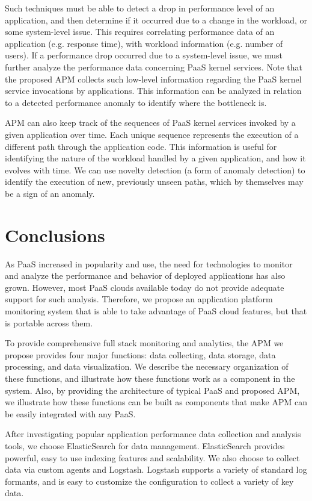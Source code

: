 \documentclass[11pt]{article}
\begin{document}
Such techniques must be able to detect a drop in performance level of an application, and then
determine if it occurred due to a change in the workload, or some system-level issue. This requires
correlating performance data of an application (e.g. response time), with workload information (e.g. number
of users). If a performance drop
occurred due to a system-level issue, we must further analyze the performance data concerning
PaaS kernel services. Note that the proposed APM collects such low-level information regarding
the PaaS kernel service invocations by applications. This information can be analyzed in relation 
to a detected performance anomaly to identify where the bottleneck is.

APM can also keep track of the sequences of PaaS kernel services invoked by a given application over time.
Each unique sequence represents the execution of a different path through the application code. 
This information is useful for
identifying the nature of the workload handled by a given application, and how it evolves with time. 
We can use novelty detection (a form of anomaly detection) to identify the execution of new, previously
unseen paths, which by themselves may be a sign of an anomaly.

\section{Conclusions}
As PaaS increased in popularity and use, the need 
for technologies to monitor and analyze the performance and behavior of
deployed applications has also grown. 
However, most PaaS clouds available today do not provide adequate support
for such analysis.
Therefore, we propose an application platform monitoring system that 
is able to take advantage of PaaS cloud features, but that is portable
across them.

To provide comprehensive full stack monitoring and analytics, 
the APM we propose provides four major functions:
data collecting, data storage, data processing, and data visualization. 
We describe the necessary organization of
these functions, and illustrate how these functions work as 
a component in the system. Also, by providing the
architecture of typical PaaS and proposed APM, we illustrate how these functions can be built as components that
make APM can be easily integrated with any PaaS.

After investigating popular application performance data collection and analysis tools, we choose ElasticSearch for data management.
ElasticSearch provides powerful, easy to use indexing features and scalability. We also choose to collect data via custom agents and Logstash.
Logstash supports a variety of standard log formants,
and is easy to customize the configuration to collect a variety of key data.



\end{document}
